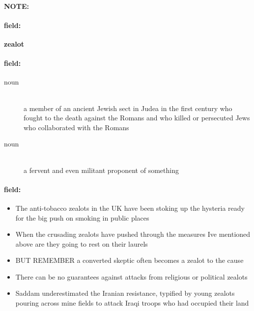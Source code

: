 \documentclass[12pt]{article}
\newenvironment{note}{\paragraph{NOTE:}}{}
\newenvironment{field}{\paragraph{field:}}{}
\begin{document}
\begin{note}
\begin{field}
\textbf{\large zealot}
\end{field}


\begin{field}
\begin{description}
\item[noun] \hfill \\ 
a member of an ancient Jewish sect in Judea in the first century who fought to the death against the Romans and who killed or persecuted Jews who collaborated with the Romans

\item[noun] \hfill \\ 
a fervent and even militant proponent of something

\end{description}
\end{field}

\begin{field}
\begin{itemize}
\item The anti-tobacco zealots in the UK have been stoking up the hysteria ready for the big push on smoking in public places
\item When the crusading zealots have pushed through the measures Ive mentioned above are they going to rest on their laurels
\item BUT REMEMBER a converted skeptic often becomes a zealot to the cause
\item There can be no guarantees against attacks from religious or political zealots
\item Saddam underestimated the Iranian resistance, typified by young zealots pouring across mine fields to attack Iraqi troops who had occupied their land
\end{itemize}
\end{field}
\end{note}
\end{document}
